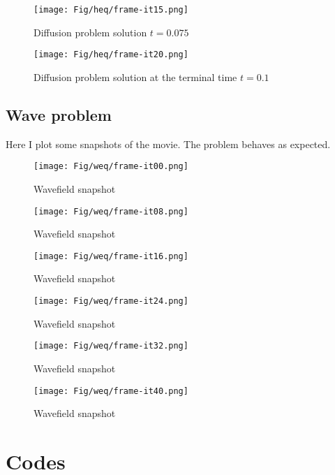 \documentclass[10pt]{article}
\begin{document}
\begin{figure}
  \texttt{[image: Fig/heq/frame-it15.png]}
\caption{Diffusion problem solution $t=0.075$}
\end{figure}

\begin{figure}
  \texttt{[image: Fig/heq/frame-it20.png]}
\caption{Diffusion problem solution at the terminal time $t=0.1$}
\end{figure}


\subsection{Wave problem}

Here I plot some snapshots of the movie. The problem behaves as expected.

\begin{figure}
  \texttt{[image: Fig/weq/frame-it00.png]}
\caption{Wavefield snapshot}
\end{figure}

\begin{figure}
  \texttt{[image: Fig/weq/frame-it08.png]}
\caption{Wavefield snapshot}

\end{figure}
\begin{figure}
  \texttt{[image: Fig/weq/frame-it16.png]}
\caption{Wavefield snapshot}

\end{figure}

\begin{figure}
  \texttt{[image: Fig/weq/frame-it24.png]}
\caption{Wavefield snapshot}

\end{figure}

\begin{figure}
  \texttt{[image: Fig/weq/frame-it32.png]}
\caption{Wavefield snapshot}

\end{figure}

\begin{figure}
  \texttt{[image: Fig/weq/frame-it40.png]}
\caption{Wavefield snapshot}

\end{figure}


\section{Codes}
\end{document}
